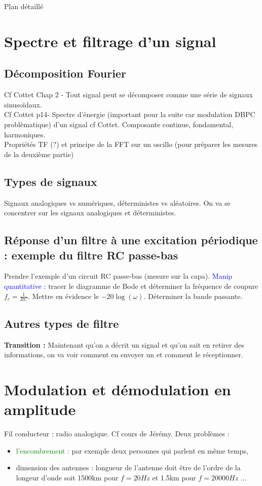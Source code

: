 \begin{reportBlock}{Plan détaillé}
\section{Spectre et filtrage d'un signal}

\subsection{Décomposition Fourier}

Cf Cottet Chap 2 - Tout signal peut se décomposer comme une série de signaux sinusoïdaux.\\

Cf Cottet p14- Spectre d'énergie (important pour la suite car modulation DBPC problèmatique) d'un signal cf Cottet. Composante continue, fondamental, harmoniques.\\

Propriétés TF (?) et principe de la FFT sur un oscillo (pour préparer les mesures de la deuxième partie)

\subsection{Types de signaux}
Signaux analogiques vs numériques, déterministes vs aléatoires. On va se concentrer sur les signaux analogiques et déterministes.


\subsection{Réponse d'un filtre à une excitation périodique : exemple du filtre RC passe-bas}
Prendre l'exemple d'un circuit RC passe-bas (mesure sur la capa). \textcolor{blue}{Manip quantitative :} tracer le diagramme de Bode et déterminer la fréquence de coupure $f_c = \frac{1}{RC}$. Mettre en évidence le $-20\log(\omega)$. Déterminer la bande passante.

\subsection{Autres types de filtre}
\textbf{Transition :} Maintenant qu'on a décrit un signal et qu'on sait en retirer des informations, on va voir comment en envoyer un et comment le réceptionner.

\section{Modulation et démodulation en amplitude}
Fil conducteur : radio analogique. Cf cours de Jérémy.
Deux problèmes : 
\begin{itemize}
    \item \textcolor{green}{l'encombrement :} par exemple deux personnes qui parlent en même temps,
    \item dimension des antennes : longueur de l'antenne doit être de l'ordre de la longeur d'onde soit 1500km pour $f=20Hz$ et 1.5km pour $f=20000Hz$ ...
\end{itemize}


\end{reportBlock}
